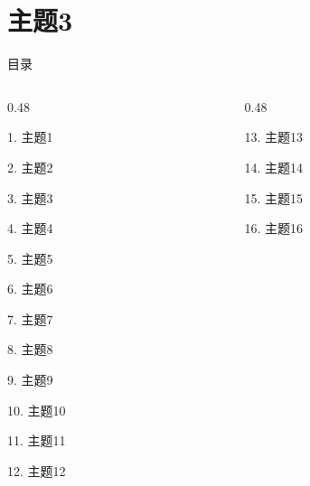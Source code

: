 \documentclass[aspectratio=169,10pt,fontset=fandol]{ctexbeamer}
\begin{document}
\section{主题3}
\begin{frame}[t,fragile]{目录}
\small
\begin{columns}[T,onlytextwidth]
\begin{column}{0.48\textwidth}
{\color{black}\small 1. 主题1\par}\vspace{0.22em}
{\color{black}\small 2. 主题2\par}\vspace{0.22em}
{\color{blue}\small 3. 主题3\par}\vspace{0.22em}
{\color{gray!40}\small 4. 主题4\par}\vspace{0.22em}
{\color{gray!40}\small 5. 主题5\par}\vspace{0.22em}
{\color{gray!40}\small 6. 主题6\par}\vspace{0.22em}
{\color{gray!40}\small 7. 主题7\par}\vspace{0.22em}
{\color{gray!40}\small 8. 主题8\par}\vspace{0.22em}
{\color{gray!40}\small 9. 主题9\par}\vspace{0.22em}
{\color{gray!40}\small 10. 主题10\par}\vspace{0.22em}
{\color{gray!40}\small 11. 主题11\par}\vspace{0.22em}
{\color{gray!40}\small 12. 主题12\par}\vspace{0.22em}
\end{column}
\begin{column}{0.48\textwidth}
{\color{gray!40}\small 13. 主题13\par}\vspace{0.22em}
{\color{gray!40}\small 14. 主题14\par}\vspace{0.22em}
{\color{gray!40}\small 15. 主题15\par}\vspace{0.22em}
{\color{gray!40}\small 16. 主题16\par}\vspace{0.22em}

\end{column}
\end{columns}
\end{frame}
\end{document}
